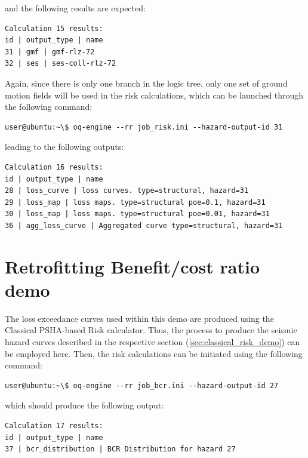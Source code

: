 and the following results are expected:

\begin{Verbatim}[frame=single, commandchars=\\\{\}, samepage=true]
Calculation 15 results:
id | output_type | name
31 | gmf | gmf-rlz-72
32 | ses | ses-coll-rlz-72
\end{Verbatim}

Again, since there is only one branch in the logic tree, only one set of ground motion fields will be used in the risk calculations, which can be launched through the following command:

\begin{Verbatim}[frame=single, commandchars=\\\{\}, samepage=true]
user@ubuntu:~\$ oq-engine --rr job_risk.ini --hazard-output-id 31
\end{Verbatim}

leading to the following outputs:

\begin{Verbatim}[frame=single, commandchars=\\\{\}, samepage=true]
Calculation 16 results:
id | output_type | name
28 | loss_curve | loss curves. type=structural, hazard=31
29 | loss_map | loss maps. type=structural poe=0.1, hazard=31
30 | loss_map | loss maps. type=structural poe=0.01, hazard=31
36 | agg_loss_curve | Aggregated curve type=structural, hazard=31
\end{Verbatim}

\section{Retrofitting Benefit/cost ratio demo}
The loss exceedance curves used within this demo are produced using the Classical PSHA-based Risk calculator. Thus, the process to produce the seismic hazard curves described in the respective section (\ref{sec:classical_risk_demo}) can be employed here. Then, the risk calculations can be initiated using the following command:

\begin{Verbatim}[frame=single, commandchars=\\\{\}, samepage=true]
user@ubuntu:~\$ oq-engine --rr job_bcr.ini --hazard-output-id 27
\end{Verbatim}

which should produce the following output:

\begin{Verbatim}[frame=single, commandchars=\\\{\}, samepage=true]
Calculation 17 results:
id | output_type | name
37 | bcr_distribution | BCR Distribution for hazard 27
\end{Verbatim}